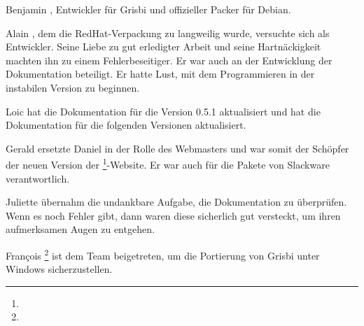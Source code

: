 Benjamin , Entwickler für Grisbi und offizieller Packer für \gls{Debian}.

Alain , dem die \gls{RedHat}-Verpackung zu langweilig wurde, versuchte sich als Entwickler. Seine Liebe zu gut erledigter Arbeit und seine Hartnäckigkeit machten ihn zu einem Fehlerbeseitiger. Er war auch an der Entwicklung der Dokumentation beteiligt. Er hatte Lust, mit dem Programmieren in der instabilen Version zu beginnen.

Loic  hat die Dokumentation für die Version 0.5.1 aktualisiert und hat die Dokumentation für die folgenden Versionen aktualisiert.

Gerald  ersetzte Daniel  in der Rolle des Webmasters und war somit der Schöpfer der neuen Version der \footnote{\urlGrisbi{}}-Website. Er war auch für die Pakete von \gls{Slackware} verantwortlich.

Juliette  übernahm die undankbare Aufgabe, die Dokumentation zu überprüfen. Wenn es noch Fehler gibt, dann waren diese sicherlich gut versteckt, um ihren aufmerksamen Augen zu entgehen.

François \footnote{\urlFrancoisTerrotEmail{}} ist dem Team beigetreten, um die \gls{Portierung} von Grisbi unter \gls{Windows} sicherzustellen.

